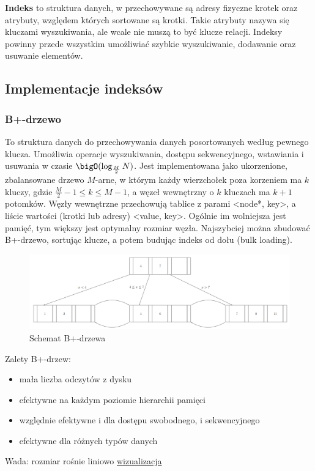 \textbf{Indeks} to struktura danych, w przechowywane są adresy fizyczne krotek oraz atrybuty, względem których sortowane są krotki. Takie atrybuty nazywa się kluczami wyszukiwania, ale wcale nie muszą to być klucze relacji.
Indeksy powinny przede wszystkim umożliwiać szybkie wyszukiwanie, dodawanie oraz usuwanie elementów.

\subsection{Implementacje indeksów}
\subsubsection*{B+-drzewo}
To struktura danych do przechowywania danych posortowanych według pewnego klucza. Umożliwia operacje wyszukiwania, dostępu sekwencyjnego, wstawiania i usuwania w czasie \( \bigO(\log_{\frac{M}{2}} N) \).
Jest implementowana jako ukorzenione, zbalansowane drzewo \( M \)-arne, w którym każdy wierzchołek poza korzeniem ma \( k \) kluczy, gdzie \( \frac{M}{2} - 1 \leq k \leq M - 1 \),
a węzeł wewnętrzny o \( k \) kluczach ma \( k+1 \) potomków. Węzły wewnętrzne przechowują tablice z parami <node*, key>, a liście wartości (krotki lub adresy) <value, key>.
Ogólnie im wolniejsza jest pamięć, tym większy jest optymalny rozmiar węzła.
Najszybciej można zbudować B+-drzewo, sortując klucze, a potem budując indeks od dołu (bulk loading).
\begin{figure}[h!]
    \centering
    \includegraphics[width=0.75\linewidth]{chapters/id/indeksy/b_tree}
    \caption{Schemat B+-drzewa}
\end{figure}

Zalety B+-drzew:
\begin{itemize}
    \item mała liczba odczytów z dysku
    \item efektywne na każdym poziomie hierarchii pamięci
    \item względnie efektywne i dla dostępu swobodnego, i sekwencyjnego
    \item efektywne dla różnych typów danych
\end{itemize}
Wada: rozmiar rośnie liniowo
\href{https://www.cs.usfca.edu/~galles/visualization/BPlusTree.html}{wizualizacja \fcTree}

